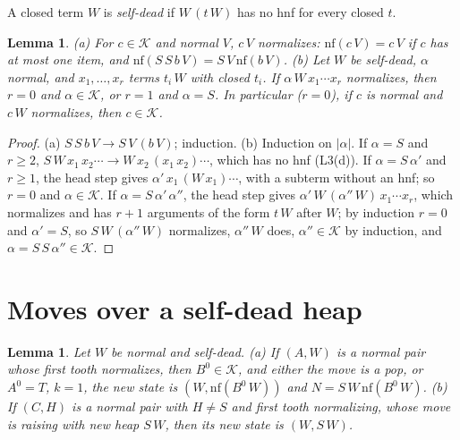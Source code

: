\documentclass[11pt]{amsart}
\newtheorem{lemma}[theorem]{Lemma}
\theoremstyle{definition}
\newcommand{\sz}[1]{\lvert#1\rvert}
\newcommand{\nf}{\mathrm{nf}}
\newcommand{\Kc}{\mathcal K}
\begin{document}
A closed term $W$ is \emph{self-dead} if $W\,(t\,W)$ has no hnf for every closed $t$.

\begin{lemma}\label{lem:K}
\textup{(a)} For $c\in\Kc$ and normal $V$, $c\,V$ normalizes: $\nf(c\,V)=c\,V$ if $c$ has at most
one item, and $\nf(S\,S\,b\,V)=S\,V\,\nf(b\,V)$.
\textup{(b)} Let $W$ be self-dead, $\alpha$ normal, and $x_1,\dots,x_r$ terms $t_i\,W$ with closed
$t_i$. If $\alpha\,W\,x_1\cdots x_r$ normalizes, then $r=0$ and $\alpha\in\Kc$, or $r=1$ and
$\alpha=S$. In particular \textup{(}$r=0$\textup{)}, if $c$ is normal and $c\,W$ normalizes, then
$c\in\Kc$.
\end{lemma}

\begin{proof}
(a) $S\,S\,b\,V\to S\,V\,(b\,V)$; induction. (b) Induction on $\sz\alpha$. If $\alpha=S$ and $r\ge2$,
$S\,W\,x_1\,x_2\cdots\to W\,x_2\,(x_1\,x_2)\cdots$, which has no hnf (L3(d)). If $\alpha=S\,\alpha'$
and $r\ge1$, the head step gives $\alpha'\,x_1\,(W\,x_1)\cdots$, with a subterm without an hnf; so
$r=0$ and $\alpha\in\Kc$. If
$\alpha=S\,\alpha'\,\alpha''$, the head step gives $\alpha'\,W\,(\alpha''\,W)\,x_1\cdots x_r$, which
normalizes and has $r+1$ arguments of the form $t\,W$ after $W$; by induction $r=0$ and
$\alpha'=S$, so $S\,W\,(\alpha''\,W)$ normalizes, $\alpha''\,W$ does, $\alpha''\in\Kc$ by induction,
and $\alpha=S\,S\,\alpha''\in\Kc$.
\end{proof}

\section{Moves over a self-dead heap}

\begin{lemma}\label{lem:dh}
Let $W$ be normal and self-dead.
\textup{(a)} If $(A,W)$ is a normal pair whose first tooth normalizes, then $B^0\in\Kc$, and either
the move is a pop, or $A^0=T$, $k=1$, the new state is $(W,\nf(B^0\,W))$ and
$N=S\,W\,\nf(B^0\,W)$.
\textup{(b)} If $(C,H)$ is a normal pair with $H\ne S$ and first tooth
normalizing, whose move is raising with new heap $S\,W$, then its new state is $(W,S\,W)$.
\end{lemma}
\end{document}
